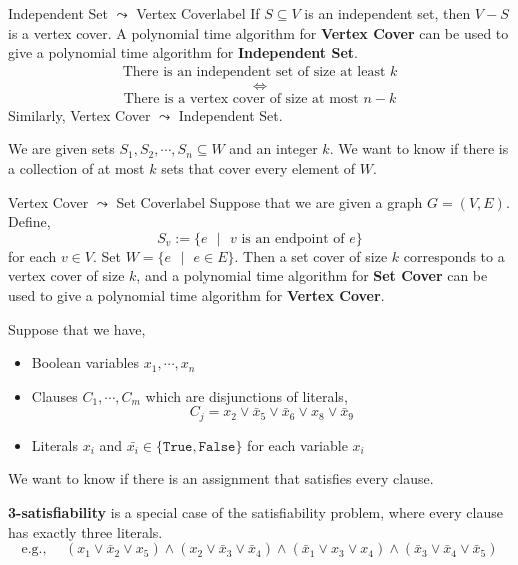 	\begin{ex}{Independent Set $\leadsto$ Vertex Cover}{label}
		If $S \subseteq V$ is an independent set, then $V - S$ is a vertex cover. A polynomial time algorithm for \textbf{Vertex Cover} can be used to give a polynomial time algorithm for \textbf{Independent Set}.
		\begin{align*}
			\text{There is an independent set of size at least $k$}
		\end{align*}
		\[\iff\]
		\begin{align*}
			\text{There is a vertex cover of size at most $n-k$}
		\end{align*}
		\noindent Similarly, Vertex Cover $\leadsto$ Independent Set.
	\end{ex}

	\begin{defn}
		We are given sets $S_1, S_2, \cdots, S_n \subseteq W$ and an integer $k$. We want to know if there is a collection of at most $k$ sets that cover every element of $W$.
	\end{defn}

	\begin{ex}{Vertex Cover $\leadsto$ Set Cover}{label}
		Suppose that we are given a graph $G = (V, E)$. Define,
		\[S_v := \{e \text{ $|$ $v$ is an endpoint of $e$}\}\]
		\noindent for each $v \in V$. Set $W = \{e \text{ $|$ } e \in E\}$. Then a set cover of size $k$ corresponds to a vertex cover of size $k$, and a polynomial time algorithm for \textbf{Set Cover} can be used to give a polynomial time algorithm for \textbf{Vertex Cover}.
	\end{ex}

	\begin{defn}
		Suppose that we have,
		\begin{itemize}
			\item Boolean variables $x_1, \cdots, x_n$
			\item Clauses $C_1, \cdots, C_m$ which are disjunctions of literals,
			\[C_{j}=x_{2} \lor \bar{x}_{5} \lor \bar{x}_{6} \lor x_{8} \lor \bar{x}_{9}\]
			\item Literals $x_i$ and $\bar{x_i} \in \{\texttt{True}, \texttt{False}\}$ for each variable $x_i$
		\end{itemize}
		\noindent We want to know if there is an assignment that satisfies every clause.
	\end{defn}

	\begin{defn}[3-Satisfiability]
		\textbf{3-satisfiability} is a special case of the satisfiability problem, where every clause has exactly three literals.
		\[\text{e.g., }\quad \left(x_{1} \lor \bar{x}_{2} \lor x_{5}\right) \wedge\left(x_{2} \lor \bar{x}_{3} \lor \bar{x}_{4}\right) \wedge\left(\bar{x}_{1} \lor x_{3} \lor x_{4}\right) \wedge\left(\bar{x}_{3} \lor \bar{x}_{4} \lor \bar{x}_{5}\right)\]
	\end{defn}

